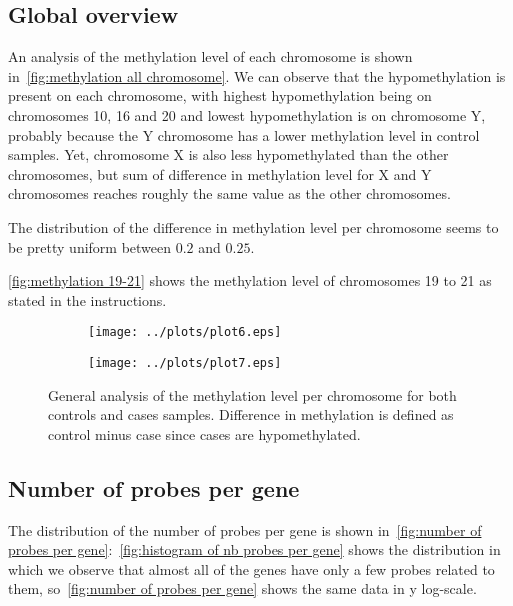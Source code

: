 \documentclass{article}
\begin{document}
\subsection{Global overview}

An analysis of the methylation level of each chromosome is shown in~\autoref{fig:methylation all chromosome}. We can observe that the
hypomethylation is present on each chromosome, with highest hypomethylation being on chromosomes 10, 16 and 20 and lowest hypomethylation
is on chromosome Y, probably because the Y chromosome has a lower methylation level in control samples. Yet, chromosome X is also
less hypomethylated than the other chromosomes, but sum of difference in methylation level for X and Y chromosomes reaches roughly
the same value as the other chromosomes.

The distribution of the difference in methylation level per chromosome seems to be pretty uniform between $0.2$ and $0.25$.

\autoref{fig:methylation 19-21} shows the methylation level of chromosomes 19 to 21 as stated in the instructions.

\begin{figure}[!t]
	\begin{subfigure}{.5\textwidth}
		\texttt{[image: ../plots/plot6.eps]}
	\end{subfigure}
	\begin{subfigure}{.5\textwidth}
		\texttt{[image: ../plots/plot7.eps]}
	\end{subfigure}
	\caption{General analysis of the methylation level per chromosome for both controls and cases samples. Difference in methylation
	is defined as control minus case since cases are hypomethylated.\label{fig:methylation per chromosome}}
\end{figure}

\subsection{Number of probes per gene}

The distribution of the number of probes per gene is shown in~\autoref{fig:number of probes per gene}:~\autoref{fig:histogram of nb probes per gene}
shows the distribution in which we observe that almost all of the genes have only a few probes related to them, so~\autoref{fig:number of probes per gene}
shows the same data in y log-scale.
\end{document}
